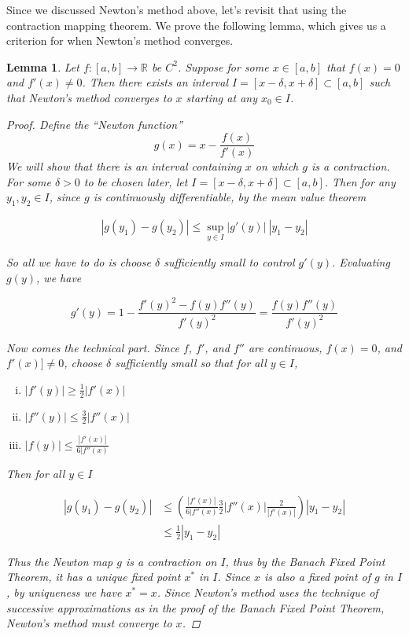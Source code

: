 \documentclass{article}
\newtheorem{lemma}[theorem]{Lemma}
\def\R{{\mathbb R}}
\begin{document}
Since we discussed Newton's method above, let's revisit that using the contraction mapping theorem. We prove the following lemma, which gives us a criterion for when Newton's method converges.


\begin{lemma}
Let $f: [a, b] \rightarrow \R$ be $C^2$. Suppose for some $x \in [a, b]$ that $f(x) = 0$ and $f'(x) \neq 0$. Then there exists an interval $I = [x - \delta, x + \delta] \subset [a, b]$ such that Newton's method converges to $x$ starting at any $x_0 \in I$.
\begin{proof}
Define the ``Newton function''
\[
g(x) = x - \frac{f(x)}{f'(x)}
\]
We will show that there is an interval containing $x$ on which $g$ is a contraction. For some $\delta > 0$ to be chosen later, let $I = [x - \delta, x + \delta ] \subset [a, b]$. Then for any $y_1, y_2 \in I$, since $g$ is continuously differentiable, by the mean value theorem

\begin{align*}
|g(y_1) - g(y_2)| \leq \sup_{y \in I} |g'(y)| \: |y_1 - y_2|
\end{align*}

So all we have to do is choose $\delta$ sufficiently small to control $g'(y)$. Evaluating $g(y)$, we have

\[
g'(y) = 1 - \frac{f'(y)^2 - f(y)f''(y)}{f'(y)^2} = \frac{f(y)f''(y)}{f'(y)^2}
\]

Now comes the technical part. Since $f$, $f'$, and $f''$ are continuous, $f(x) = 0$, and $f'(x) ]\neq 0$, choose $\delta$ sufficiently small so that for all $y \in I$,
\begin{enumerate}[(i)]
	\item $|f'(y)| \geq \frac{1}{2}|f'(x)|$ 
	\item $|f''(y)| \leq \frac{3}{2}|f''(x)|$
	\item $|f(y)| \leq \frac{|f'(x)|}{6 |f''(x)}$
\end{enumerate}

Then for all $y \in I$

\begin{align*}
|g(y_1) - g(y_2)| &\leq 
\left( \frac{|f'(x)|}{6 |f''(x)} \frac{3}{2}|f''(x)| \frac{2}{|f'(x)|}\right)|y_1 - y_2| \\ 
&\leq \frac{1}{2}|y_1 - y_2| 
\end{align*}

Thus the Newton map $g$ is a contraction on $I$, thus by the Banach Fixed Point Theorem, it has a unique fixed point $x^*$ in $I$. Since $x$ is also a fixed point of $g$ in $I$, by uniqueness we have $x^* = x$. Since Newton's method uses the technique of successive approximations as in the proof of the Banach Fixed Point Theorem, Newton's method must converge to $x$.

\end{proof}
\end{lemma}
\end{document}
